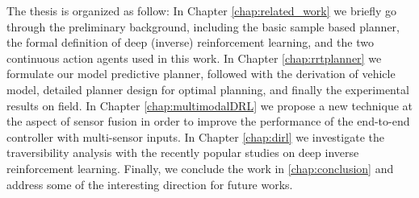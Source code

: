 \documentclass[../thesis.tex]{subfiles}
\begin{document}
The thesis is organized as follow:
In Chapter \ref{chap:related_work} we briefly go through the preliminary background, including the basic sample based planner, the formal definition of deep (inverse) reinforcement learning, and the two continuous action agents used in this work.
In Chapter \ref{chap:rrtplanner} we formulate our model predictive planner, followed with the derivation of vehicle model, detailed planner design for optimal planning, and finally the experimental results on field.
In Chapter \ref{chap:multimodalDRL} we propose a new technique at the aspect of sensor fusion in order to improve the performance of the end-to-end controller with multi-sensor inputs. 
In Chapter \ref{chap:dirl} we investigate the traversibility analysis with the recently popular studies on deep inverse reinforcement learning.
Finally, we conclude the work in \ref{chap:conclusion} and address some of the interesting direction for future works.
\end{document}
